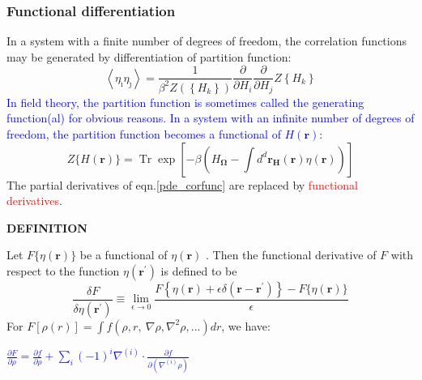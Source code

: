 \documentclass[12pt,titlepage]{article}
\newcommand{\redp}[1]{\textcolor{red}{#1}}
\newcommand{\bluep}[1]{\textcolor{blue}{#1}}
\numberwithin{equation}{section}
\begin{document}
\subsubsection{Functional differentiation}
In a system with a finite number of degrees of freedom, the correlation functions may be generated by differentiation of partition function:
\begin{equation}
\label{pde_corfunc}
\left\langle\eta_{\hat{\imath}} \eta_{\hat{\jmath}}\right\rangle=\frac{1}{\beta^{2} Z\left(\left\{H_{k}\right\}\right)} \frac{\partial}{\partial H_{i}} \frac{\partial}{\partial H_{j}} Z\left\{H_{k}\right\}
\end{equation}
\bluep{In field theory, the partition function is sometimes called the generating function(al) for obvious reasons. In a system with an infinite number of degrees of freedom, the partition function becomes a functional\index{functional} of $H(\mathbf{r})$}:
\begin{equation}
Z\{H(\mathbf{r})\}=\operatorname{Tr} \exp \left[-\beta\left(H_{\mathbf{\Omega}}-\int d^{d} \mathbf{r}_{\boldsymbol{H}}(\mathbf{r}) \eta(\mathbf{r})\right)\right]
\end{equation}
The partial derivatives of eqn.\ref{pde_corfunc} are replaced by \redp{functional derivatives}.
\noindent

\textbf{DEFINITION}

Let $F\{\eta(\mathbf{r})\}$ be a functional of $\eta(\mathbf{r})$ . Then the functional derivative of $F$ with respect to the function $\eta\left(\mathbf{r}^{\prime}\right)$ is defined to be
\begin{equation}
\frac{\delta F}{\delta \eta\left(\mathbf{r}^{\prime}\right)} \equiv \lim _{\epsilon \rightarrow 0} \frac{F\left\{\eta(\mathbf{r})+\epsilon \delta\left(\mathbf{r}-\mathbf{r}^{\prime}\right)\right\}-F\{\eta(\mathbf{r})\}}{\epsilon}
\end{equation}
For $\displaystyle F[ \rho ( r)] =\int f\left( \rho ,r,\ \nabla \rho ,\nabla ^{2} \rho ,...\right) dr$, we have:

\bluep{$\displaystyle \frac{\partial F}{\partial \rho } =\frac{\partial f}{\partial \rho } +\sum _{i}( -1)^{i} \nabla ^{( i)} \cdot \frac{\partial f}{\partial \left( \nabla ^{( i)} \rho \right)}$}
\end{document}
